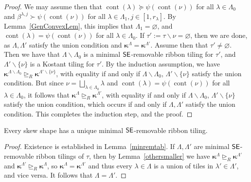 \documentclass[Unicode,ALCO]{cedram}
\newcommand{\0}{{\bar 0}}
\newcommand{\ssee}{{\sf SE}}
\newcommand{\bkap}{\boldsymbol{\kappa}}
\def\cont{{\operatorname{cont}}}
\begin{document}
\begin{proof}
We may assume then that \(\cont(\lambda) \succeq \psi(\cont(\nu))\) for all \(\lambda \in \Lambda_0\) and \(\beta^{\lambda,j} \succ \psi(\cont(\nu))\) for all \(\lambda \in \Lambda_1, j \in [1,r_\lambda]\). By Lemma~\ref{GenConvexLem}, this implies that \(\Lambda_1 = \varnothing\), and \(\cont(\lambda) = \psi(\cont(\nu))\) for all \(\lambda \in \Lambda_0\). If \(\tau':=\tau \backslash \nu = \varnothing\), then we are done, as \(\Lambda, \Lambda'\) satisfy the union condition and \(\bkap^\Lambda = \bkap^{\Lambda'}\). Assume then that \(\tau' \neq \varnothing\). Then we have that \(\Lambda \backslash \Lambda_{0}\) is a minimal \(\ssee\)-removable ribbon tiling for \(\tau'\), and \(\Lambda'\backslash\{\nu\}\) is a Kostant tiling for \(\tau'\). By the induction assumption, we have \(\bkap^{\Lambda \backslash \Lambda_{0}} \trianglerighteq_R \bkap^{\Lambda' \backslash \{\nu\}}\), with equality if and only if \(\Lambda \backslash \Lambda_{0}\), \( \Lambda' \backslash \{\nu\}\) satisfy the union condition. But since \(\nu = \bigsqcup_{\lambda \in \Lambda_0} \lambda\) and \(\cont(\lambda) = \psi(\cont(\nu))\) for all \(\lambda \in \Lambda_0\), it follows that \(\bkap^\Lambda \trianglerighteq_R \bkap^{\Lambda'}\), with equality if and only if \(\Lambda \backslash \Lambda_{0}\), \( \Lambda' \backslash \{\nu\}\) satisfy the union condition, which occurs if and only if \(\Lambda, \Lambda'\) satisfy the union condition. This completes the induction step, and the proof.
\end{proof} 

\begin{coro}\label{uniquerib}
Every skew shape has a unique minimal \(\ssee\)-removable ribbon tiling.
\end{coro}
\begin{proof}
Existence is established in Lemma~\ref{minremtab}.
If \(\Lambda, \Lambda'\) are minimal \(\ssee\)-removable ribbon tilings of \(\tau\), then by Lemma~\ref{othersmaller} we have \(\bkap^{\Lambda} \trianglerighteq_R \bkap^{\Lambda'}\) and \(\bkap^{\Lambda'} \trianglerighteq_R \bkap^{\Lambda}\), so \(\bkap^{\Lambda} = \bkap^{\Lambda'}\) and thus every \(\lambda \in \Lambda\) is a union of tiles in \(\lambda' \in \Lambda'\), and vice versa. It follows that \(\Lambda = \Lambda'\).
\end{proof}
\end{document}
